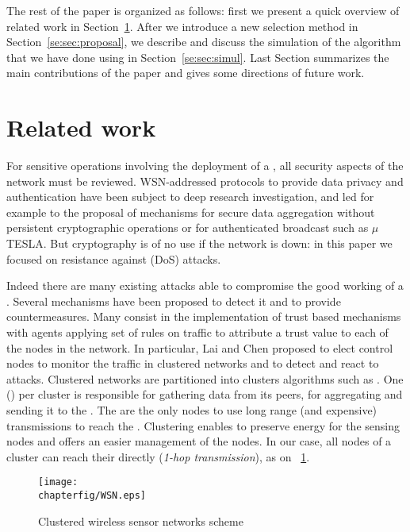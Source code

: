 The rest of the paper is organized as follows: first we present a quick overview of related work in Section~\ref{se:sec:related}. After we introduce a new \cn selection method in Section~\ref{se:sec:proposal}, we describe and discuss the simulation of the algorithm that we have done using \ns in Section~\ref{se:sec:simul}.
Last Section summarizes the main contributions of the paper and gives some directions of future work.

\section{Related work}
\label{se:sec:related}

For sensitive operations involving the deployment of a \wsn, all security aspects of the network must be reviewed.
WSN-addressed protocols to provide data privacy\cite{OX09} and authentication\cite{SOBMCN11} have been subject to deep research investigation, and led for example to the proposal of mechanisms for secure data aggregation without persistent cryptographic operations\cite{WDSX07} or for authenticated broadcast such as $\mu$TESLA\cite{PSWCT02}.
But cryptography is of no use if the network is down: in this paper we focused on resistance against \dos (DoS) attacks.

Indeed there are many existing attacks able to compromise the good working of a \wsn.%
Several mechanisms have been proposed to detect it and to provide countermeasures\cite{SSS11}. %
Many consist in the implementation of trust based mechanisms\cite{MC10,F-GRL07} with agents applying set of rules\cite{RKKK13} on traffic to attribute a trust value to each of the nodes in the network.
In particular, Lai and Chen\cite{LC08} proposed to elect control nodes to monitor the traffic in clustered networks and to detect and react to \dos attacks.
Clustered networks are partitioned into clusters \via algorithms such as \leach\cite{HHT02}.
One \ch (\CH) per cluster is responsible for gathering data from its peers, for aggregating and sending it to the \bs.
The \CHs are the only nodes to use long range (and expensive) transmissions to reach the \bs.
Clustering enables to preserve energy for the sensing nodes and offers an easier management of the nodes.
In our case, all nodes of a cluster can reach their \ch directly (\emph{1-hop transmission}), as on \figurename~\ref{se:fig:wsn}.
\begin{figure}[h]
    \centering
    \texttt{[image: \\chapterfig/WSN.eps]}
    \caption{Clustered wireless sensor networks scheme}\label{se:fig:wsn}
\end{figure}

